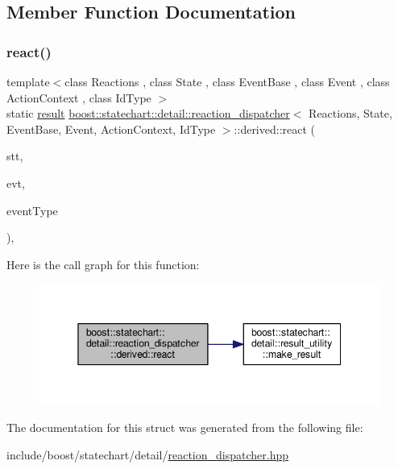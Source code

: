 \subsection{Member Function Documentation}
\mbox{\label{structboost_1_1statechart_1_1detail_1_1reaction__dispatcher_1_1derived_a6e2921ea9b17c87e6670ed9a4dd11e7b}} 
\subsubsection{\texorpdfstring{react()}{react()}}
{\footnotesize\ttfamily template$<$class Reactions , class State , class Event\+Base , class Event , class Action\+Context , class Id\+Type $>$ \\
static \mbox{\hyperlink{namespaceboost_1_1statechart_abe807f6598b614d6d87bb951ecd92331}{result}} \mbox{\hyperlink{classboost_1_1statechart_1_1detail_1_1reaction__dispatcher}{boost\+::statechart\+::detail\+::reaction\+\_\+dispatcher}}$<$ Reactions, State, Event\+Base, Event, Action\+Context, Id\+Type $>$\+::derived\+::react (\begin{DoxyParamCaption}\item[{State \&}]{stt,  }\item[{const Event\+Base \&}]{evt,  }\item[{const Id\+Type \&}]{event\+Type }\end{DoxyParamCaption})\hspace{0.3cm}{\ttfamily [inline]}, {\ttfamily [static]}}

Here is the call graph for this function\+:
\nopagebreak
\begin{figure}[H]
\begin{center}
\leavevmode
\includegraphics[width=345pt]{structboost_1_1statechart_1_1detail_1_1reaction__dispatcher_1_1derived_a6e2921ea9b17c87e6670ed9a4dd11e7b_cgraph}
\end{center}
\end{figure}


The documentation for this struct was generated from the following file\+:\begin{DoxyCompactItemize}
\item 
include/boost/statechart/detail/\mbox{\hyperlink{reaction__dispatcher_8hpp}{reaction\+\_\+dispatcher.\+hpp}}\end{DoxyCompactItemize}
